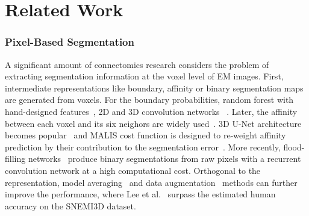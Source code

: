 
\section{Related Work}


\subsubsection{Pixel-Based Segmentation}
A significant amount of connectomics research considers the problem of extracting segmentation information at the voxel level of EM images.
First, intermediate representations like boundary, affinity or binary segmentation maps are generated from voxels.
For the boundary probabilities, random forest with hand-designed features~\cite{kaynig2015large}, 2D and 3D convolution networks ~\cite{bogovic2013learned,seymour2016rhoananet,ronneberger2015u,ciresan2012deep,jain2010boundary,amelio_segmentation}.
Later, the affinity between each voxel and its six neighors are widely used~\cite{lee2015recursive,parag2017anisotropic,cciccek20163d,turaga2010convolutional,lee2017superhuman}. 3D U-Net architecture becomes popular~\cite{cciccek20163d} and MALIS cost function is designed to re-weight affinity prediction by their contribution to the segmentation error~\cite{briggman2009maximin}.
More recently, flood-filling networks~\cite{januszewski2016flood} produce binary segmentations from raw pixels with a recurrent convolution network at a high computational cost.
Orthogonal to the representation, model averaging~\cite{zeng2017deepem3d} and data augmentation~\cite{lee2017superhuman} methods can further improve the performance, where Lee et al.~\cite{lee2017superhuman} surpass the estimated human accuracy on the SNEMI3D dataset.

